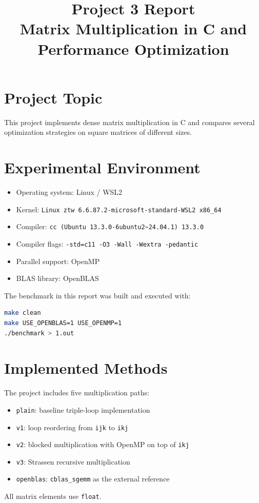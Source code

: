\documentclass[11pt,a4paper]{article}
\title{Project 3 Report\\\large Matrix Multiplication in C and Performance Optimization}
\author{}
\date{}
\begin{document}
\maketitle

\section{Project Topic}
This project implements dense matrix multiplication in C and compares several optimization strategies on square matrices of different sizes.

\section{Experimental Environment}
\begin{itemize}
    \item Operating system: Linux / WSL2
    \item Kernel: \texttt{Linux ztw 6.6.87.2-microsoft-standard-WSL2 x86\_64}
    \item Compiler: \texttt{cc (Ubuntu 13.3.0-6ubuntu2\textasciitilde24.04.1) 13.3.0}
    \item Compiler flags: \texttt{-std=c11 -O3 -Wall -Wextra -pedantic}
    \item Parallel support: OpenMP
    \item BLAS library: OpenBLAS
\end{itemize}

The benchmark in this report was built and executed with:

\begin{lstlisting}[language=bash]
make clean
make USE_OPENBLAS=1 USE_OPENMP=1
./benchmark > 1.out
\end{lstlisting}

\section{Implemented Methods}
The project includes five multiplication paths:
\begin{itemize}
    \item \texttt{plain}: baseline triple-loop implementation
    \item \texttt{v1}: loop reordering from \texttt{ijk} to \texttt{ikj}
    \item \texttt{v2}: blocked multiplication with OpenMP on top of \texttt{ikj}
    \item \texttt{v3}: Strassen recursive multiplication
    \item \texttt{openblas}: \texttt{cblas\_sgemm} as the external reference
\end{itemize}
All matrix elements use \texttt{float}.
\end{document}
